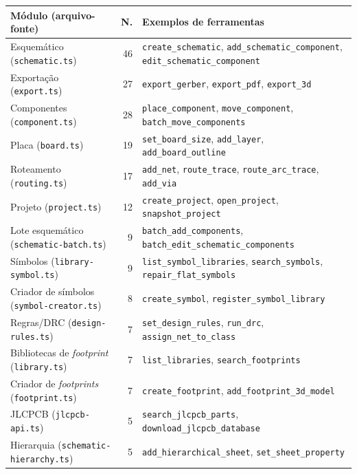 \begin{quadro}[htbp]
\centering
\small
\caption{Distribuição das ferramentas pelos 24 módulos registrados.}
\label{qua:modulos}
\begin{tabular}{@{}p{6.2cm}rp{6.2cm}@{}}
\toprule
\textbf{Módulo (arquivo-fonte)} & \textbf{N.} & \textbf{Exemplos de ferramentas} \\
\midrule
Esquemático (\texttt{schematic.ts}) & 46 & \texttt{create\_schematic}, \texttt{add\_schematic\_component}, \texttt{edit\_schematic\_component} \\
Exportação (\texttt{export.ts}) & 27 & \texttt{export\_gerber}, \texttt{export\_pdf}, \texttt{export\_3d} \\
Componentes (\texttt{component.ts}) & 28 & \texttt{place\_component}, \texttt{move\_component}, \texttt{batch\_move\_components} \\
Placa (\texttt{board.ts}) & 19 & \texttt{set\_board\_size}, \texttt{add\_layer}, \texttt{add\_board\_outline} \\
Roteamento (\texttt{routing.ts}) & 17 & \texttt{add\_net}, \texttt{route\_trace}, \texttt{route\_arc\_trace}, \texttt{add\_via} \\
Projeto (\texttt{project.ts}) & 12 & \texttt{create\_project}, \texttt{open\_project}, \texttt{snapshot\_project} \\
Lote esquemático (\texttt{schematic-batch.ts}) & 9 & \texttt{batch\_add\_components}, \texttt{batch\_edit\_schematic\_components} \\
Símbolos (\texttt{library-symbol.ts}) & 9 & \texttt{list\_symbol\_libraries}, \texttt{search\_symbols}, \texttt{repair\_flat\_symbols} \\
Criador de símbolos (\texttt{symbol-creator.ts}) & 8 & \texttt{create\_symbol}, \texttt{register\_symbol\_library} \\
Regras/DRC (\texttt{design-rules.ts}) & 7 & \texttt{set\_design\_rules}, \texttt{run\_drc}, \texttt{assign\_net\_to\_class} \\
Bibliotecas de \emph{footprint} (\texttt{library.ts}) & 7 & \texttt{list\_libraries}, \texttt{search\_footprints} \\
Criador de \emph{footprints} (\texttt{footprint.ts}) & 7 & \texttt{create\_footprint}, \texttt{add\_footprint\_3d\_model} \\
JLCPCB (\texttt{jlcpcb-api.ts}) & 5 & \texttt{search\_jlcpcb\_parts}, \texttt{download\_jlcpcb\_database} \\
Hierarquia (\texttt{schematic-hierarchy.ts}) & 5 & \texttt{add\_hierarchical\_sheet}, \texttt{set\_sheet\_property} \\

\end{tabular}
\end{quadro}
